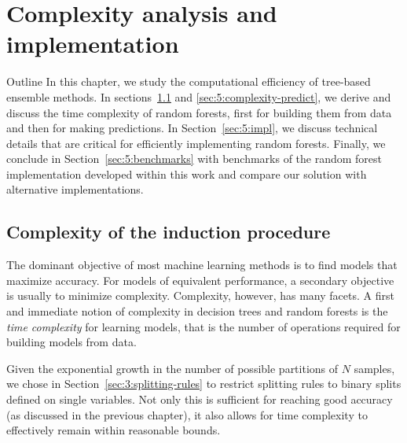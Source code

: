 \chapter{Complexity analysis and implementation}\label{ch:complexity}

\begin{remark}{Outline}
In this chapter, we study the computational efficiency of tree-based ensemble
methods. In sections~\ref{sec:5:complexity-fit} and \ref{sec:5:complexity-predict},
we derive and discuss the time complexity of random forests, first for building them from data and then for making predictions. In
Section~\ref{sec:5:impl}, we discuss technical details that are critical
for efficiently  implementing random forests. Finally, we conclude in
Section~\ref{sec:5:benchmarks} with benchmarks of the random forest implementation developed
within this work and compare our solution with alternative implementations.
\end{remark}

\section{Complexity of the induction procedure}
\label{sec:5:complexity-fit}

The dominant objective of most machine learning methods is to find models that
maximize accuracy. For models of equivalent performance, a secondary objective
is usually to minimize complexity. Complexity, however, has many facets. A
first and immediate notion of complexity in decision trees and random forests is
the \textit{time complexity} for learning models, that is the number of
operations required for building models from data.

Given the exponential growth in the number of possible partitions of $N$
samples, we chose in Section~\ref{sec:3:splitting-rules} to restrict splitting
rules to binary splits defined on single variables. Not only this is sufficient
for reaching good accuracy (as discussed in the previous chapter),
it also allows for time complexity to effectively remain within reasonable bounds.

